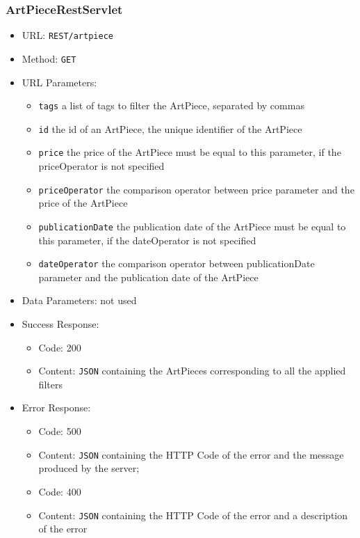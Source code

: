 \subsubsection*{ArtPieceRestServlet}




\begin{itemize}
    \item URL: \texttt{REST/artpiece}
    \item Method: \texttt{GET}
    \item URL Parameters:
    \begin{itemize}
        \item \texttt{tags} a list of tags to filter the ArtPiece, separated by commas
        \item \texttt{id} the id of an ArtPiece, the unique identifier of the ArtPiece
        \item \texttt{price} the price of the ArtPiece must be equal to this parameter, if the priceOperator is not specified
        \item \texttt{priceOperator} the comparison operator between price parameter and the price of the ArtPiece
        \item \texttt{publicationDate} the publication date of the ArtPiece must be equal to this parameter, if the dateOperator is not specified
        \item \texttt{dateOperator} the comparison operator between publicationDate parameter and the publication date of the ArtPiece
    \end{itemize}
    \item Data Parameters: not used
    \item Success Response:
    \begin{itemize}
        \item Code: 200
        \item Content: \texttt{JSON} containing the ArtPieces corresponding to all the applied filters
    \end{itemize}
    \item  Error Response:
    \begin{itemize}
        \item Code: 500
        \item Content: \texttt{JSON} containing the HTTP Code of the error and the message produced by the server;
        \item Code: 400
        \item Content: \texttt{JSON} containing the HTTP Code of the error and a description of the error
    \end{itemize}


\end{itemize}

